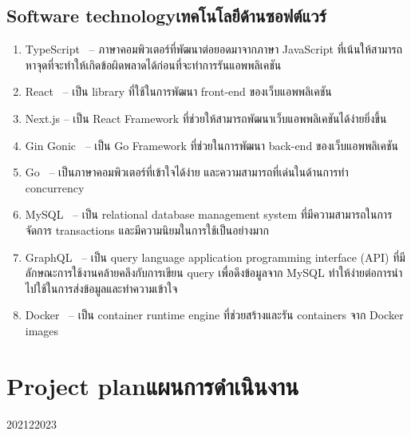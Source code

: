 \subsection{\ifenglish Software technology\else เทคโนโลยีด้านซอฟต์แวร์\fi}
\begin{enumerate}
    \item TypeScript~\cite{typescript} -- ภาษาคอมพิวเตอร์ที่พัฒนาต่อยอดมาจากภาษา JavaScript 
        ที่เน้นให้สามารถหาจุดที่จะทำให้เกิดข้อผิดพลาดได้ก่อนที่จะทำการรันแอพพลิเคชัน
    \item React~\cite{react} -- เป็น library ที่ใช้ในการพัฒนา front-end ของเว็บแอพพลิเคชัน
    \item Next.js\cite{nextjs} -- เป็น React Framework ที่ช่วยให้สามารถพัฒนาเว็บแอพพลิเคชันได้ง่ายยิ่งขึ้น
    \item Gin Gonic~\cite{gingonic} -- เป็น Go Framework ที่ช่วยในการพัฒนา back-end ของเว็บแอพพลิเคชัน
    \item Go~\cite{golang} -- เป็นภาษาคอมพิวเตอร์ที่เข้าใจได้ง่าย และความสามารถที่เด่นในด้านการทำ concurrency
    \item MySQL~\cite{mysql} -- เป็น relational database management system ที่มีความสามารถในการจัดการ transactions 
        และมีความนิยมในการใช้เป็นอย่างมาก
    \item GraphQL~\cite{graphql} --  เป็น query language application programming interface (API) ที่มีลักษณะการใช้งานคล้ายคลึงกับการเขียน query เพื่อดึงข้อมูลจาก MySQL
    ทำให้ง่ายต่อการนำไปใช้ในการส่งข้อมูลและทำความเข้าใจ
    \item Docker~\cite{dke} -- เป็น container runtime engine ที่ช่วยสร้างและรัน containers จาก Docker images
\end{enumerate}

\section{\ifenglish Project plan\else แผนการดำเนินงาน\fi}
\begin{plan}{12}{2021}{2}{2023}
\end{plan}

